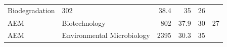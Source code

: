 \documentclass[11pt,]{article}
\begin{document}
\begin{longtable}[]{@{}llrrrr@{}}
\begin{minipage}[t]{0.43\columnwidth}
Biodegradation\strut
\end{minipage} & \begin{minipage}[t]{0.04\columnwidth}\raggedleft\strut
302\strut
\end{minipage} & \begin{minipage}[t]{0.08\columnwidth}\raggedleft\strut
38.4\strut
\end{minipage} & \begin{minipage}[t]{0.11\columnwidth}\raggedleft\strut
35\strut
\end{minipage} & \begin{minipage}[t]{0.11\columnwidth}\raggedleft\strut
26\strut
\end{minipage}\tabularnewline
\begin{minipage}[t]{0.06\columnwidth}\raggedright\strut
AEM\strut
\end{minipage} & \begin{minipage}[t]{0.43\columnwidth}\raggedright\strut
Biotechnology\strut
\end{minipage} & \begin{minipage}[t]{0.04\columnwidth}\raggedleft\strut
802\strut
\end{minipage} & \begin{minipage}[t]{0.08\columnwidth}\raggedleft\strut
37.9\strut
\end{minipage} & \begin{minipage}[t]{0.11\columnwidth}\raggedleft\strut
30\strut
\end{minipage} & \begin{minipage}[t]{0.11\columnwidth}\raggedleft\strut
27\strut
\end{minipage}\tabularnewline
\begin{minipage}[t]{0.06\columnwidth}\raggedright\strut
AEM\strut
\end{minipage} & \begin{minipage}[t]{0.43\columnwidth}\raggedright\strut
Environmental Microbiology\strut
\end{minipage} & \begin{minipage}[t]{0.04\columnwidth}\raggedleft\strut
2395\strut
\end{minipage} & \begin{minipage}[t]{0.08\columnwidth}\raggedleft\strut
30.3\strut
\end{minipage} & \begin{minipage}[t]{0.11\columnwidth}\raggedleft\strut
35\strut
\end{minipage} & \begin{minipage}[t]{0.11\columnwidth}\raggedleft\strut

\end{minipage}
\end{longtable}
\end{document}

